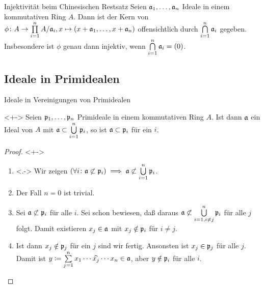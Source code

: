 \begin{frame}{Injektivität beim Chinesischen Restsatz}
    Seien \(\mathfrak{a}_1, \dotsc, \mathfrak{a}_n\) Ideale in einem kommutativen Ring
    \(A\). Dann ist der Kern von \(\phi\colon A \to \prod\limits_{i = 1}^n
    A/\mathfrak{a}_i, x \mapsto (x + \mathfrak{a}_1, \dotsc, x + \mathfrak{a}_n)\)
    offensichtlich durch \(\bigcap\limits_{i = 1}^n \mathfrak{a}_i\) gegeben.
    \\
    Insbesondere ist \(\phi\) genau dann injektiv, wenn
    \(\bigcap\limits_{i = 1}^n \mathfrak{a}_i = (0)\).
\end{frame}

\subsection{Ideale in Primidealen}

\begin{frame}{Ideale in Vereinigungen von Primidealen}
    \begin{proposition}<+->
    	\label{prop:ideal_in_union_of_primes}
        Seien \(\mathfrak{p}_1, \dotsc, \mathfrak{p}_n\) Primideale in einem kommutativen Ring
        \(A\). Ist dann \(\mathfrak{a}\) ein Ideal von \(A\) mit \(\mathfrak{a}
        \subset \bigcup\limits_{i = 1}^n \mathfrak{p}_i\), so ist \(\mathfrak{a} \subset
        \mathfrak{p}_i\) für ein \(i\).
    \end{proposition}
    \begin{proof}<+->
        \begin{enumerate}[<+->]
        \item<.->
            Wir zeigen \((\forall i\colon \mathfrak{a} \not\subset \mathfrak{p}_i)
            \implies \mathfrak{a} \not\subset \bigcup\limits_{i = 1}^n \mathfrak{p}_i\).
        \item
            Der Fall \(n = 0\) ist trivial.
        \item
            Sei \(\mathfrak{a} \not\subset \mathfrak{p}_i\) für alle \(i\). Sei
            schon bewiesen, daß daraus
            \(\mathfrak{a} \not\subset \bigcup\limits_{i = 1, i \neq j}^n \mathfrak{p}_i\)
            für alle \(j\) folgt. Damit existieren
            \(x_j \in \mathfrak{a}\) mit \(x_j \notin \mathfrak{p}_i\) für \(i \neq j\).
        \item
            Ist dann \(x_j \notin \mathfrak{p}_j\) für ein \(j\) sind wir fertig.
            Ansonsten ist \(x_j \in \mathfrak{p}_j\) für alle \(j\). Damit ist
            \(y \coloneqq
            \sum\limits_{j = 1}^n x_1 \dotsm \widehat{x_j} \dotsm x_n
            \in \mathfrak{a}\), aber \(y \notin \mathfrak{p}_i\) für alle \(i\).
            \qedhere
        \end{enumerate}
    \end{proof}
\end{frame}

